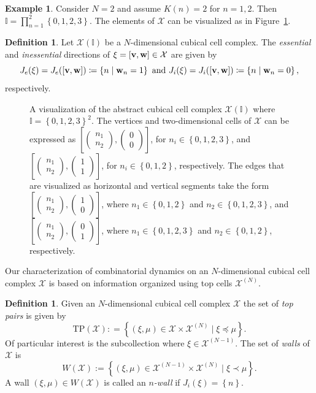 \documentclass[12pt, notitlepage]{amsart}
\newcommand{\setof}[1]{\left\{ {#1}\right\}}
\newcommand{\bv}{{\bf v}}
\newcommand{\bw}{{\bf w}}
\newcommand{\I}{{\mathbb{I}}}
\newcommand{\cX}{{\mathcal X}}
\newcommand{\TP}{{\mathrm{TP}}}
\newcommand{\defcell}[4]{\left[ \left(
      \begin{smallmatrix}
        #1 \\ #2
    \end{smallmatrix}\right),\left(
      \begin{smallmatrix}
        #3 \\ #4
\end{smallmatrix}\right)\right]}
\theoremstyle{definition}
\newtheorem{defn}[thm]{Definition}
\newtheorem{ex}[thm]{Example}
\begin{document}
  \begin{ex}
    \label{ex:cubicalcomplex}
    Consider $N=2$ and assume $K(n)=2$ for $n=1,2$. Then $\I = \prod_{n=1}^2 \setof{0,1,2,3}$. The elements of $\cX$ can be visualized as in Figure~\ref{fig:position_vectors}.
  \end{ex}

  \begin{defn}
    \label{defn:JeJi}
    Let $\cX(\I)$ be a $N$-dimensional cubical cell complex. The \emph{essential} and \emph{inessential} directions of $\xi = [\bv,\bw] \in \cX$ are given by
    \[
      J_e(\xi) = J_e([\bv,\bw]) \coloneqq \setof{n\mid \bw_n=1} \text{ and } J_i(\xi) = J_i([\bv,\bw]) \coloneqq \setof{n\mid \bw_n=0},
    \]
    respectively.
  \end{defn}

  \begin{figure}
    \centering
    \caption{A visualization of the abstract cubical cell complex $\cX(\I)$ where $\I = \setof{0,1,2,3}^2$. The vertices and two-dimensional cells of $\cX$ can be expressed as $\defcell{n_1}{n_2}{0}{0}$, for  $n_i\in \setof{0,1,2,3}$, and $\defcell{n_1}{n_2}{1}{1}$, for  $n_i\in \setof{0,1,2}$, respectively. The edges that are visualized as horizontal and vertical segments  take the form $\defcell{n_1}{n_2}{1}{0}$, where $n_1\in \setof{0,1,2}$ and $n_2\in \setof{0,1,2,3}$,  and $\defcell{n_1}{n_2}{0}{1}$, where $n_1\in \setof{0,1,2,3}$ and $n_2\in \setof{0,1,2}$, respectively.}
    \label{fig:position_vectors}
  \end{figure}

  Our characterization of combinatorial dynamics on an $N$-dimensional cubical cell complex $\cX$ is based on information organized using top cells $\cX^{(N)}$.

  \begin{defn}
    \label{defn:wall}
    Given an $N$-dimensional cubical cell complex $\cX$ the set of \emph{top pairs} is given by
    \[
      \TP(\cX) : = \setof{(\xi, \mu) \in \cX \times \cX^{(N)} \mid \xi \preceq \mu}.
    \]
    Of particular interest is the subcollection where $\xi \in \cX^{(N-1)}$.
    The set of \emph{walls} of $\cX$ is
    \[
      W(\cX) := \setof{(\xi, \mu) \in \cX^{(N-1)} \times \cX^{(N)} \mid \xi \prec \mu}.
    \]
    A wall $(\xi, \mu)\in W(\cX)$ is called an \emph{$n$-wall} if $J_i(\xi) = \setof{n}$.
  \end{defn}
\end{document}
